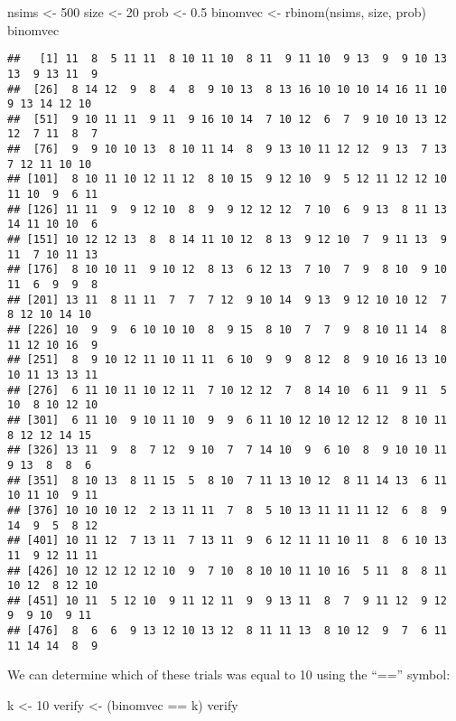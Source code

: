 \documentclass[
]{book}
\newenvironment{Shaded}{\begin{snugshade}}{\end{snugshade}}
\newcommand{\DecValTok}[1]{\textcolor[rgb]{0.00,0.00,0.81}{#1}}
\newcommand{\FloatTok}[1]{\textcolor[rgb]{0.00,0.00,0.81}{#1}}
\newcommand{\FunctionTok}[1]{\textcolor[rgb]{0.00,0.00,0.00}{#1}}
\newcommand{\NormalTok}[1]{#1}
\newcommand{\OtherTok}[1]{\textcolor[rgb]{0.56,0.35,0.01}{#1}}
\newcommand{\SpecialCharTok}[1]{\textcolor[rgb]{0.00,0.00,0.00}{#1}}
\begin{document}
\begin{Shaded}
\begin{Highlighting}[]
\NormalTok{nsims }\OtherTok{\textless{}{-}} \DecValTok{500}
\NormalTok{size }\OtherTok{\textless{}{-}} \DecValTok{20}
\NormalTok{prob }\OtherTok{\textless{}{-}} \FloatTok{0.5}
\NormalTok{binomvec }\OtherTok{\textless{}{-}} \FunctionTok{rbinom}\NormalTok{(nsims, size, prob)}
\NormalTok{binomvec}
\end{Highlighting}
\end{Shaded}

\begin{verbatim}
##   [1] 11  8  5 11 11  8 10 11 10  8 11  9 11 10  9 13  9  9 10 13 13  9 13 11  9
##  [26]  8 14 12  9  8  4  8  9 10 13  8 13 16 10 10 10 14 16 11 10  9 13 14 12 10
##  [51]  9 10 11 11  9 11  9 16 10 14  7 10 12  6  7  9 10 10 13 12 12  7 11  8  7
##  [76]  9  9 10 10 13  8 10 11 14  8  9 13 10 11 12 12  9 13  7 13  7 12 11 10 10
## [101]  8 10 11 10 12 11 12  8 10 15  9 12 10  9  5 12 11 12 12 10 11 10  9  6 11
## [126] 11 11  9  9 12 10  8  9  9 12 12 12  7 10  6  9 13  8 11 13 14 11 10 10  6
## [151] 10 12 12 13  8  8 14 11 10 12  8 13  9 12 10  7  9 11 13  9 11  7 10 11 13
## [176]  8 10 10 11  9 10 12  8 13  6 12 13  7 10  7  9  8 10  9 10 11  6  9  9  8
## [201] 13 11  8 11 11  7  7  7 12  9 10 14  9 13  9 12 10 10 12  7  8 12 10 14 10
## [226] 10  9  9  6 10 10 10  8  9 15  8 10  7  7  9  8 10 11 14  8 11 12 10 16  9
## [251]  8  9 10 12 11 10 11 11  6 10  9  9  8 12  8  9 10 16 13 10 10 11 13 13 11
## [276]  6 11 10 11 10 12 11  7 10 12 12  7  8 14 10  6 11  9 11  5 10  8 10 12 10
## [301]  6 11 10  9 10 11 10  9  9  6 11 10 12 10 12 12 12  8 10 11  8 12 12 14 15
## [326] 13 11  9  8  7 12  9 10  7  7 14 10  9  6 10  8  9 10 10 11  9 13  8  8  6
## [351]  8 10 13  8 11 15  5  8 10  7 11 13 10 12  8 11 14 13  6 11 10 11 10  9 11
## [376] 10 10 10 12  2 13 11 11  7  8  5 10 13 11 11 11 12  6  8  9 14  9  5  8 12
## [401] 10 11 12  7 13 11  7 13 11  9  6 12 11 11 10 11  8  6 10 13 11  9 12 11 11
## [426] 10 12 12 12 12 10  9  7 10  8 10 10 11 10 16  5 11  8  8 11 10 12  8 12 10
## [451] 10 11  5 12 10  9 11 12 11  9  9 13 11  8  7  9 11 12  9 12  9  9 10  9 11
## [476]  8  6  6  9 13 12 10 13 12  8 11 11 13  8 10 12  9  7  6 11 11 14 14  8  9
\end{verbatim}

We can determine which of these trials was equal to 10 using the ``=='' symbol:

\begin{Shaded}
\begin{Highlighting}[]
\NormalTok{k }\OtherTok{\textless{}{-}} \DecValTok{10}
\NormalTok{verify }\OtherTok{\textless{}{-}}\NormalTok{ (binomvec }\SpecialCharTok{==}\NormalTok{ k)}
\NormalTok{verify}
\end{Highlighting}
\end{Shaded}
\end{document}

